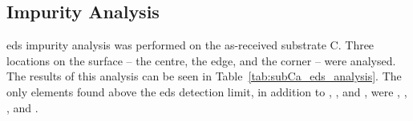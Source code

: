 
\subsection{Impurity Analysis}

\Ac{eds} impurity analysis was performed on the as-received substrate C. Three locations on the surface -- the centre, the edge, and the corner -- were analysed. The results of this analysis can be seen in Table~\ref{tab:subCa_eds_analysis}. The only elements found above the \ac{eds} detection limit, in addition to , , and , were , , , and .

